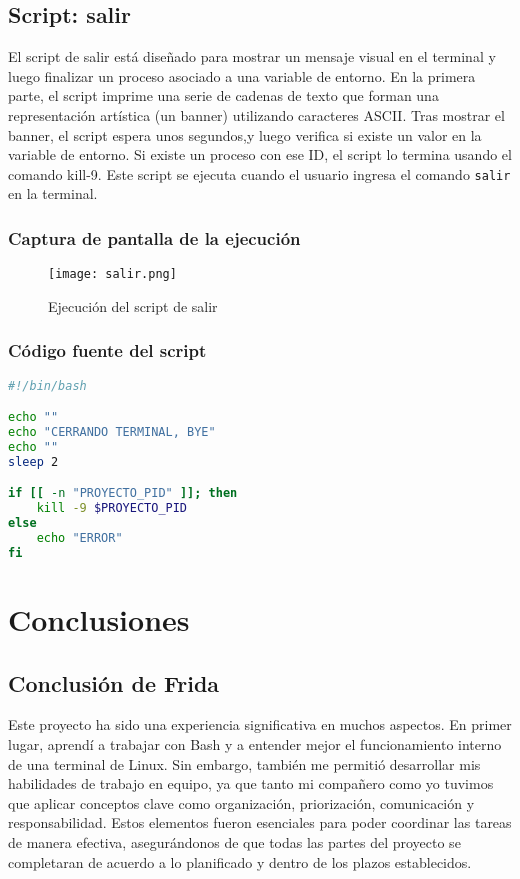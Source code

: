 \documentclass{article}
\begin{document}
\subsection{Script: salir}

El script de salir está diseñado para mostrar un mensaje visual en el terminal y luego finalizar un proceso asociado a una variable de entorno. En la primera parte, el script imprime una serie de cadenas de texto que forman una representación artística (un banner) utilizando caracteres ASCII. Tras mostrar el banner, el script espera unos segundos,y luego verifica si existe un valor en la variable de entorno. Si existe un proceso con ese ID, el script lo termina usando el comando kill-9.
Este script se ejecuta cuando el usuario ingresa el comando \texttt{salir} en la terminal.

\subsubsection{Captura de pantalla de la ejecución}

\begin{figure}[h!]
\centering
\texttt{[image: salir.png]}
\caption{Ejecución del script de salir}
\end{figure}

\subsubsection{Código fuente del script}

\begin{lstlisting}[language=bash]
#!/bin/bash

echo ""
echo "CERRANDO TERMINAL, BYE"
echo ""
sleep 2

if [[ -n "PROYECTO_PID" ]]; then
    kill -9 $PROYECTO_PID
else 
    echo "ERROR"
fi 

\end{lstlisting}
\pagebreak

\section{Conclusiones}

\subsection{Conclusión de Frida}

Este proyecto ha sido una experiencia significativa en muchos aspectos. En primer lugar, aprendí a trabajar con Bash y a entender mejor el funcionamiento interno de una terminal de Linux. Sin embargo, también me permitió desarrollar mis habilidades de trabajo en equipo, ya que tanto mi compañero como yo tuvimos que aplicar conceptos clave como organización, priorización, comunicación y responsabilidad. Estos elementos fueron esenciales para poder coordinar las tareas de manera efectiva, asegurándonos de que todas las partes del proyecto se completaran de acuerdo a lo planificado y dentro de los plazos establecidos.
\end{document}
